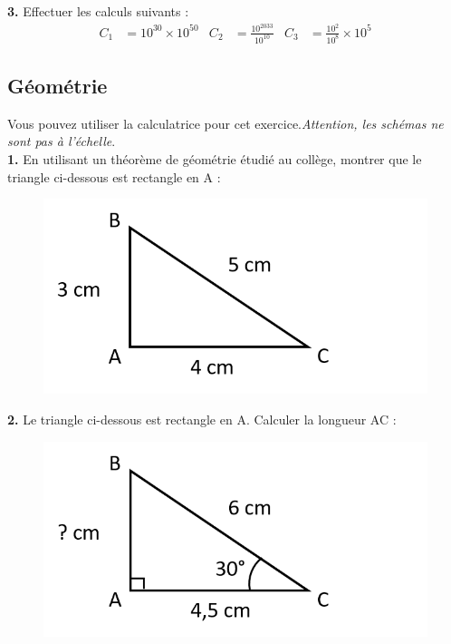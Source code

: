 \textbf{3.} Effectuer les calculs suivants :
\vspace{-0.2cm}
\begin{align*}
    C_1 &= 10^{30} \times 10^{50} & C_2 &= \frac{10^{2033}}{10^{10}} & C_3 &= \frac{10^2}{10^8}\times 10^5
\end{align*}

\subsection{Géométrie}
Vous pouvez utiliser la calculatrice pour cet exercice.\textit{Attention, les schémas ne sont pas à l'échelle}.\\

\textbf{1.} En utilisant un théorème de géométrie étudié au collège, montrer que le triangle ci-dessous est rectangle en A :

\begin{figure}[!h]
    \centering
    \includegraphics[scale=0.4]{Revision/Triangle_rectangle.png}
\end{figure}
\newpage
\textbf{2.} Le triangle ci-dessous est rectangle en A. Calculer la longueur AC :
\begin{figure}[!h]
    \centering
    \includegraphics[scale=0.4]{Revision/Triangle_rectangle_2.png}
\end{figure}

